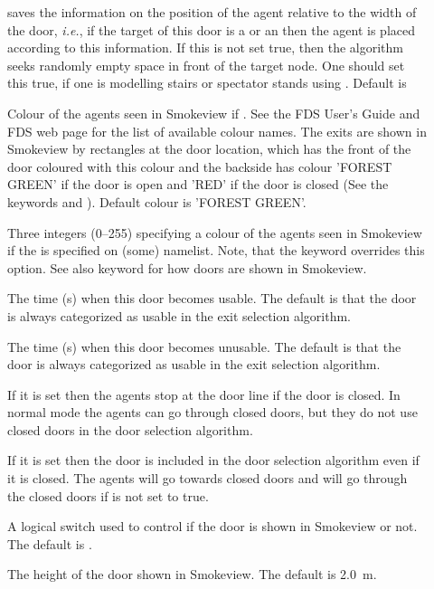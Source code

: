 \documentclass[12pt,a4paper,final,twoside]{stylevk}
\begin{document}
\begin{description}
%
\item[] saves the information on the position of the
  agent relative to the width of the door, \emph{i.e.}, if the target
  of this door is a  or an  then the agent is
  placed according to this information.  If this is not set true, then
  the algorithm seeks randomly empty space in front of the target
  node.  One should set this true, if one is modelling stairs or
  spectator stands using .  Default is 
%
\item[] Colour of the agents seen in Smokeview if
  .  See the FDS User's Guide and FDS web page
  for the list of available colour names.  The exits are shown in
  Smokeview by rectangles at the door location, which has the front of
  the door coloured with this colour and the backside has colour
  'FOREST GREEN' if the door is open and 'RED' if the door is closed
  (See the keywords  and ).
  Default colour is 'FOREST GREEN'.
%
\item[] Three integers (0--255) specifying a colour of the
  agents seen in Smokeview if the  is specified
  on (some)  namelist.  Note, that the 
  keyword overrides this option.  See also  keyword for
  how doors are shown in Smokeview.
%
\item[] The time (s) when this door becomes usable.
  The default is that the door is always categorized as usable in the
  exit selection algorithm.
%
\item[] The time (s) when this door becomes
  unusable.  The default is that the door is always categorized as
  usable in the exit selection algorithm.
%
\item[] If it is set  then the agents stop at the door line if the door is closed. In normal mode the agents can go through closed doors, but they do not use closed doors in the door selection algorithm.
%
\item[] If it is set  then the door is included in the door selection algorithm even if it is closed. The agents will go towards closed doors and will go through the closed doors if  is not set to true.
%
\item[] A logical switch used to control if the door is
  shown in Smokeview or not.  The default is .
%
\item[] The height of the door shown in Smokeview.  The
  default is 2.0~m.
%
\end{description}
\end{document}
